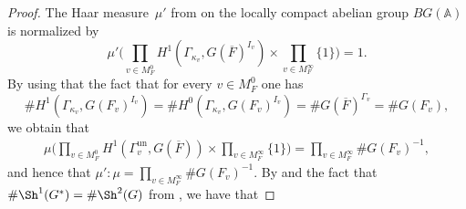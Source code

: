 \documentclass[a4paper,english,12pt]{amsart}
\newcommand{\GG}{ G}
\newcommand{\oF}{\overline F}
\newcommand{\OO}{\mathcal O}
\newcommand{\Ov}{\mathcal O _v}
\newcommand{\vMFz}{v\in M_F ^0}
\newcommand{\vMFi}{v\in M_F ^\infty}
\newcommand{\AAA}{\mathbb A}
\DeclareMathOperator{\coun}{count}
\DeclareMathOperator{\un}{un}
\numberwithin{equation}{subsection}
\begin{document}
\begin{proof}
The Haar measure~$\mu'$ from \cite[Page 71]{ArithmeticDuality} on the locally compact abelian group $BG(\AAA)$ is normalized by $$\mu'\bigg(\prod_{v\in M_F^0}H^1(\Gamma_{\kappa_v}, G(\overline{F})^{I_v})\times\prod_{v\in M_F^\infty}\{1\}\bigg)=1.$$
By using that the fact that for every $\vMFz$ one has $$\# H^1(\Gamma_{\kappa_v}, G(F_v)^{I_v})=\# H^0(\Gamma_{\kappa_v}, G(F_v)^{I_v})=\# G(\oF)^{\Gamma_v}=\# G(F_v),$$ we obtain that
\begin{align*}
\mu\bigg(\prod_{v\in M_F^0}H^1(\Gamma_v^{\un}, G(\overline{F}))\times\prod_{v\in M_F^\infty}\{1\}\bigg)=\prod_{\vMFi}\#G(F_v)^{-1},
\end{align*}
and hence that $\mu':\mu=\prod_{\vMFi}\#G(F_v)^{-1}$. %
By \cite[Chapter I, Theorem 5.6]{ArithmeticDuality} and the fact that $\#\Sh^1(G^*)=\#\Sh^2(G)$ from \cite[Chapter I, Theorem 4.20 a)]{ArithmeticDuality}, we have that

\end{proof}
\end{document}
